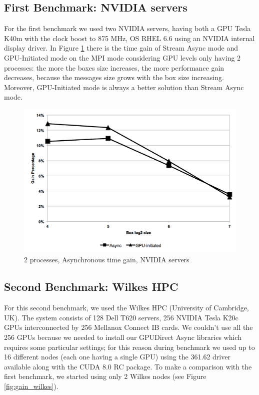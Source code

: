 \documentclass[conference]{IEEEtran}
\begin{document}
\subsection{First Benchmark: NVIDIA servers}

For the first benchmark we used two NVIDIA servers, having both a GPU Tesla K40m with the clock boost to 875 MHz, OS RHEL 6.6 using an NVIDIA internal display driver.
In Figure \ref{fig:gain_ivy} there is the time gain of Stream Async mode and GPU-Initiated mode on the MPI mode considering GPU levels only having 2 processes: the more the boxes size increases, the more performance gain decreases, because the messages size grows with the box size increasing.
Moreover, GPU-Initiated mode is always a better solution than Stream Async mode.

\begin{figure}[h]
\includegraphics[scale=0.5]{gain_ivy.png}
\caption{2 processes, Asynchronous time gain, NVIDIA servers}
\label{fig:gain_ivy}
\end{figure}


\subsection{Second Benchmark: Wilkes HPC}

For this second benchmark, we used the Wilkes HPC (University of Cambridge, UK)\cite{wilkes}. The system consists of 128 Dell T620 servers, 256 NVIDIA Tesla K20c GPUs interconnected by 256 Mellanox Connect IB cards.
We couldn't use all the 256 GPUs because we needed to install our GPUDirect Async libraries which requires some particular settings; for this reason during benchmark we used up to 16 different nodes (each one having a single GPU) using the 361.62 driver available along with the CUDA 8.0 RC package.
To make a comparison with the first benchmark, we started using only 2 Wilkes nodes (see Figure \ref{fig:gain_wilkes}).
\end{document}
